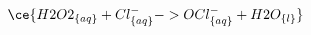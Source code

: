 \documentclass[../main.tex]{subfiles}%
\begin{document}
%
    \Xequation%
    \begin{equation}%
        \ce{H2O2_{\{aq\}} + Cl^{-}_{\{aq\}} -> OCl^{-}_{\{aq\}} + H2O_{\{l\}}}%
        \label{eq:copper-etch-5}%
    \end{equation}%
\end{document}
